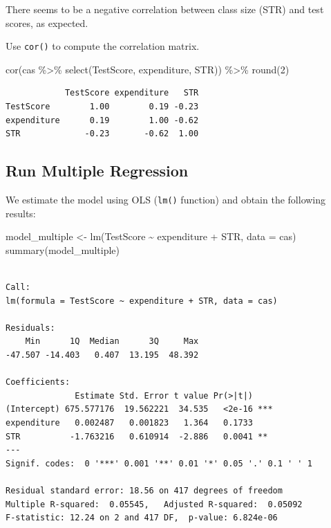 \documentclass[
  12pt,
  letterpaper,
]{scrbook}
\newenvironment{Shaded}{\begin{snugshade}}{\end{snugshade}}
\newcommand{\AttributeTok}[1]{\textcolor[rgb]{0.40,0.45,0.13}{#1}}
\newcommand{\DecValTok}[1]{\textcolor[rgb]{0.68,0.00,0.00}{#1}}
\newcommand{\FunctionTok}[1]{\textcolor[rgb]{0.28,0.35,0.67}{#1}}
\newcommand{\NormalTok}[1]{\textcolor[rgb]{0.00,0.23,0.31}{#1}}
\newcommand{\OtherTok}[1]{\textcolor[rgb]{0.00,0.23,0.31}{#1}}
\newcommand{\SpecialCharTok}[1]{\textcolor[rgb]{0.37,0.37,0.37}{#1}}
\theoremstyle{plain}
\theoremstyle{definition}
\theoremstyle{remark}
\begin{document}
There seems to be a negative correlation between class size (STR) and
test scores, as expected.

Use \texttt{cor()} to compute the correlation matrix.

\begin{Shaded}
\begin{Highlighting}[]
\FunctionTok{cor}\NormalTok{(cas }\SpecialCharTok{\%\textgreater{}\%} \FunctionTok{select}\NormalTok{(TestScore, expenditure, STR)) }\SpecialCharTok{\%\textgreater{}\%} \FunctionTok{round}\NormalTok{(}\DecValTok{2}\NormalTok{)}
\end{Highlighting}
\end{Shaded}

\begin{verbatim}
            TestScore expenditure   STR
TestScore        1.00        0.19 -0.23
expenditure      0.19        1.00 -0.62
STR             -0.23       -0.62  1.00
\end{verbatim}

\subsection{Run Multiple Regression}\label{run-multiple-regression}

We estimate the model using OLS (\texttt{lm()} function) and obtain the
following results:

\begin{Shaded}
\begin{Highlighting}[]
\NormalTok{model\_multiple }\OtherTok{\textless{}{-}} \FunctionTok{lm}\NormalTok{(TestScore }\SpecialCharTok{\textasciitilde{}}\NormalTok{ expenditure }\SpecialCharTok{+}\NormalTok{ STR, }\AttributeTok{data =}\NormalTok{ cas)}
\FunctionTok{summary}\NormalTok{(model\_multiple)}
\end{Highlighting}
\end{Shaded}

\begin{verbatim}

Call:
lm(formula = TestScore ~ expenditure + STR, data = cas)

Residuals:
    Min      1Q  Median      3Q     Max 
-47.507 -14.403   0.407  13.195  48.392 

Coefficients:
              Estimate Std. Error t value Pr(>|t|)    
(Intercept) 675.577176  19.562221  34.535   <2e-16 ***
expenditure   0.002487   0.001823   1.364   0.1733    
STR          -1.763216   0.610914  -2.886   0.0041 ** 
---
Signif. codes:  0 '***' 0.001 '**' 0.01 '*' 0.05 '.' 0.1 ' ' 1

Residual standard error: 18.56 on 417 degrees of freedom
Multiple R-squared:  0.05545,   Adjusted R-squared:  0.05092 
F-statistic: 12.24 on 2 and 417 DF,  p-value: 6.824e-06
\end{verbatim}
\end{document}
